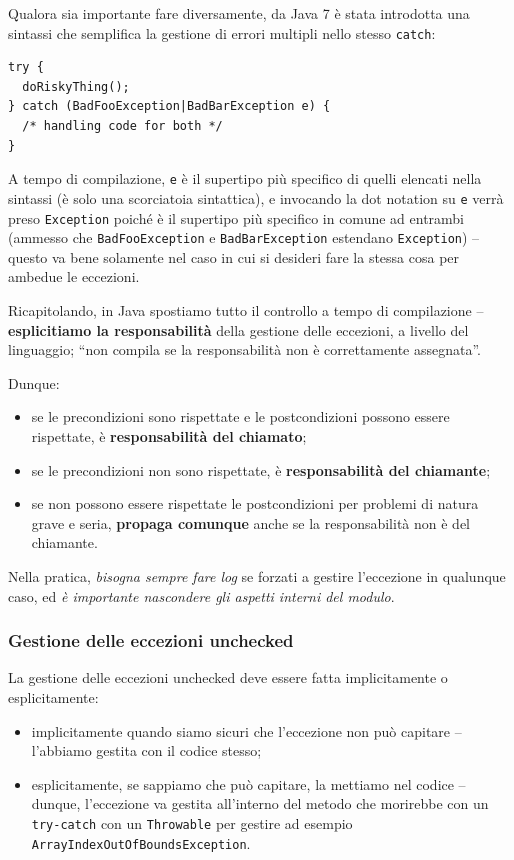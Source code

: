 \documentclass[\fontsizeclass,twocolumn]{\classname}
\theoremstyle{definition}
\theoremstyle{definition}
\begin{document}
Qualora sia importante fare diversamente, da Java 7 è stata introdotta una
sintassi che semplifica la gestione di errori multipli nello stesso
\texttt{catch}:

\begin{lstlisting}
try {
  doRiskyThing();
} catch (BadFooException|BadBarException e) {
  /* handling code for both */
}
\end{lstlisting}

A tempo di compilazione, \texttt{e} è il supertipo più specifico di quelli
elencati nella sintassi (è solo una scorciatoia sintattica), e invocando la dot
notation su \texttt{e} verrà preso \texttt{Exception} poiché è il supertipo più
specifico in comune ad entrambi (ammesso che \texttt{BadFooException} e
\texttt{BadBarException} estendano \texttt{Exception}) -- questo va bene
solamente nel caso in cui si desideri fare la stessa cosa per ambedue le
eccezioni.

Ricapitolando, in Java spostiamo tutto il controllo a tempo di compilazione --
\textbf{esplicitiamo la responsabilità} della gestione delle eccezioni, a
livello del linguaggio; ``non compila se la responsabilità non è correttamente
assegnata''.

Dunque:
\begin{itemize}
    \item se le precondizioni sono rispettate e le postcondizioni possono
        essere rispettate, è \textbf{responsabilità del chiamato};
    \item se le precondizioni non sono rispettate, è \textbf{responsabilità del
        chiamante};
    \item se non possono essere rispettate le postcondizioni per problemi di
        natura grave e seria, \textbf{propaga comunque} anche se la
        responsabilità non è del chiamante.
\end{itemize}

Nella pratica, \emph{bisogna sempre fare log} se forzati a gestire l'eccezione
in qualunque caso, ed \emph{è importante nascondere gli aspetti interni del
modulo}.

\subsubsection{Gestione delle eccezioni unchecked}

La gestione delle eccezioni unchecked deve essere fatta implicitamente o
esplicitamente:
\begin{itemize}
    \item implicitamente quando siamo sicuri che l'eccezione non può capitare
        -- l'abbiamo gestita con il codice stesso;
    \item esplicitamente, se sappiamo che può capitare, la mettiamo nel codice
        -- dunque, l'eccezione va gestita all'interno del metodo che morirebbe
        con un \texttt{try\--catch} con un \texttt{Throwable} per gestire ad
        esempio \texttt{ArrayIndexOutOf\-BoundsException}.
\end{itemize}
\end{document}
